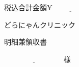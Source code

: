\documentclass[b5paper, twocolumn, landscape]{jsarticle}
\begin{document}
\vspace{-20pt}

\begin{flushright}
\hspace{100pt}税込合計金額$\underline{\yen \hspace{70pt}}$
\vspace{5pt}

\hspace{150pt}どらにゃんクリニック

\end{flushright}

\newpage


\begin{center}
\Large
明細兼領収書
\end{center}

\large
$\underline{\hspace{100pt}}$様
\end{document}
